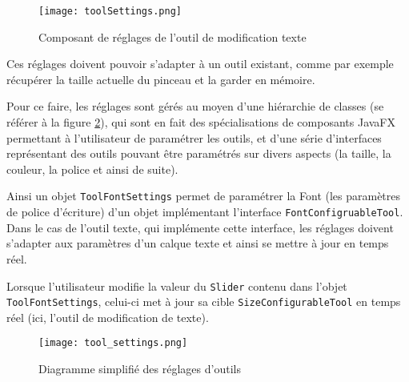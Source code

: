 \begin{figure}[H]
	\caption{Composant de réglages de l'outil de modification texte}
	\centering
	\texttt{[image: toolSettings.png]}
	\label{fig:text_settings}
\end{figure}

\par
Ces réglages doivent pouvoir s'adapter à un outil existant, comme par exemple récupérer la taille actuelle du pinceau et la garder en mémoire.

Pour ce faire, les réglages sont gérés au moyen d'une hiérarchie de classes (se référer à la figure \ref{fig:tool_settings}), qui sont en fait des spécialisations de composants JavaFX permettant à l'utilisateur de paramétrer les outils, et d'une série d'interfaces représentant des outils pouvant être paramétrés sur divers aspects (la taille, la couleur, la police et ainsi de suite).
\par
Ainsi un objet \texttt{ToolFontSettings} permet de paramétrer la Font (les paramètres de police d'écriture) d'un objet implémentant l'interface \texttt{FontConfigruableTool}. Dans le cas de l'outil texte, qui implémente cette interface, les réglages doivent s'adapter aux paramètres d'un calque texte et ainsi se mettre à jour en temps réel.
\par
Lorsque l'utilisateur modifie la valeur du \texttt{Slider} contenu dans l'objet \texttt{ToolFontSettings}, celui-ci met à jour sa cible \texttt{SizeConfigurableTool} en temps réel (ici, l'outil de modification de texte).

\begin{figure}[h]
	\caption{Diagramme simplifié des réglages d'outils}
	\centering
	\texttt{[image: tool\_settings.png]}
	\label{fig:tool_settings}
\end{figure}

